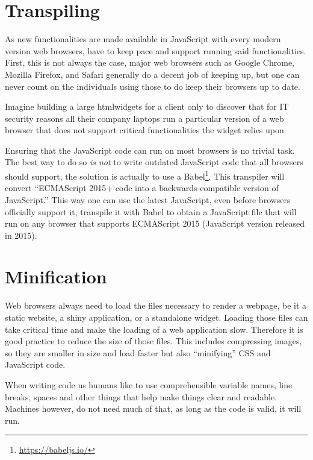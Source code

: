 \documentclass[10pt,]{krantz}
\renewcommand{\href}[2]{#2\footnote{\url{#1}}}
\begin{document}
\hypertarget{webpack-browser}{%
\section{Transpiling}\label{webpack-browser}}

As new functionalities are made available in JavaScript with every modern version web browsers, have to keep pace and support running said functionalities. First, this is not always the case, major web browsers such as Google Chrome, Mozilla Firefox, and Safari generally do a decent job of keeping up, but one can never count on the individuals using those to do keep their browsers up to date.

Imagine building a large htmlwidgets for a client only to discover that for IT security reasons all their company laptops run a particular version of a web browser that does not support critical functionalities the widget relies upon.

Ensuring that the JavaScript code can run on most browsers is no trivial task. The best way to do so \emph{is not} to write outdated JavaScript code that all browsers should support, the solution is actually to use a \href{https://babeljs.io/}{Babel}. This transpiler will convert ``ECMAScript 2015+ code into a backwards-compatible version of JavaScript.'' This way one can use the latest JavaScript, even before browsers officially support it, transpile it with Babel to obtain a JavaScript file that will run on any browser that supports ECMAScript 2015 (JavaScript version released in 2015).

\hypertarget{webpack-minification}{%
\section{Minification}\label{webpack-minification}}

Web browsers always need to load the files necessary to render a webpage, be it a static website, a shiny application, or a standalone widget. Loading those files can take critical time and make the loading of a web application slow. Therefore it is good practice to reduce the size of those files. This includes compressing images, so they are smaller in size and load faster but also ``minifying'' CSS and JavaScript code.

When writing code us humans like to use comprehensible variable names, line breaks, spaces and other things that help make things clear and readable. Machines however, do not need much of that, as long as the code is valid, it will run.
\end{document}
